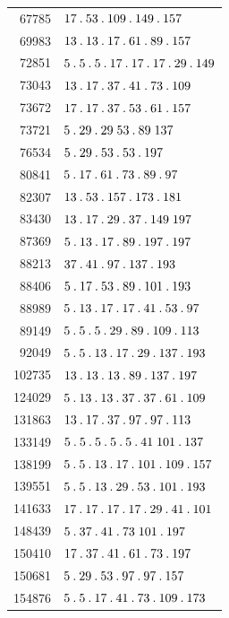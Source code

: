 \begin{longtable}{@{}r|l@{}}
67785 & $17\pdot 53\pdot 109\pdot 149\pdot 157$\\
69983 & $13\pdot 13\pdot 17\pdot 61\pdot 89\pdot 157$\\
72851 & $5\pdot 5\pdot 5\pdot 17\pdot 17\pdot 17\pdot 29\pdot 149$\\
73043 & $13\pdot 17\pdot 37\pdot 41\pdot 73\pdot 109$\\
73672 & $17\pdot 17\pdot 37\pdot 53\pdot 61\pdot 157$\\
73721 & $5\pdot 29\pdot 29\;53\pdot 89\;137$\\
76534 & $5\pdot 29\pdot 53\pdot 53\pdot 197$\\
80841 & $5\pdot 17\pdot 61\pdot 73\pdot 89\pdot 97$\\
82307 & $13\pdot 53\pdot 157\pdot 173\pdot 181$\\
83430 & $13\pdot 17\pdot 29\pdot 37\pdot 149\;197$\\
87369 & $5\pdot 13\pdot 17\pdot 89\pdot 197\pdot 197$\\
88213 & $37\pdot 41\pdot 97\pdot 137\pdot 193$\\
88406 & $5\pdot 17\pdot 53\pdot 89\pdot 101\pdot 193$\\
88989 & $5\pdot 13\pdot 17\pdot 17\pdot 41\pdot 53\pdot 97$\\
89149 & $5\pdot 5\pdot 5\pdot 29\pdot 89\pdot 109\pdot 113$\\
92049 & $5\pdot 5\pdot 13\pdot 17\pdot 29\pdot 137\pdot 193$\\
102735 & $13\pdot 13\pdot 13\pdot 89\pdot 137\pdot 197$\\
124029 & $5\pdot 13\pdot 13\pdot 37\pdot 37\pdot 61\pdot 109$\\
131863 & $13\pdot 17\pdot 37\pdot 97\pdot 97\pdot 113$\\
133149 & $5\pdot 5\pdot 5\pdot 5\pdot 5\pdot 41\;101\pdot 137$\\
138199 & $5\pdot 5\pdot 13\pdot 17\pdot 101\pdot 109\pdot 157$\\
139551 & $5\pdot 5\pdot 13\pdot 29\pdot 53\pdot 101\pdot 193$\\
141633 & $17\pdot 17\pdot 17\pdot 17\pdot 29\pdot 41\pdot 101$\\
148439 & $5\pdot 37\pdot 41\pdot 73\;101\pdot 197$\\
150410 & $17\pdot 37\pdot 41\pdot 61\pdot 73\pdot 197$\\
150681 & $5\pdot 29\pdot 53\pdot 97\pdot 97\pdot 157$\\
154876 & $5\pdot 5\pdot 17\pdot 41\pdot 73\pdot 109\pdot 173$\\

\end{longtable}
